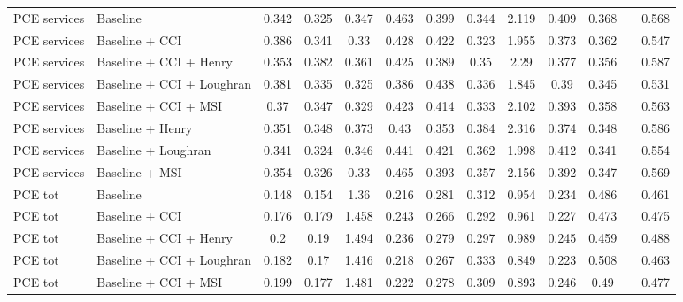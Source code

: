 \begin{table}[H]
{\begin{tabular}{llcccccccccp{1ex}c}
\hdashline 																							
PCE services	&	Baseline	&	0.342	&	0.325	&	0.347	&	0.463	&	0.399	&	0.344	&	2.119	&	0.409	&	\cellcolor{red!25}0.368	&&	0.568	\\
PCE services	&	Baseline + CCI	&	\cellcolor{red!25}0.386	&	0.341	&	0.33	&	0.428	&	0.422	&	0.323	&	1.955	&	\cellcolor{green!25}0.373	&	0.362	&&	0.547	\\
PCE services	&	Baseline + CCI + Henry	&	0.353	&	\cellcolor{red!25}0.382	&	0.361	&	0.425	&	0.389	&	0.35	&	2.29	&	0.377	&	0.356	&&	\cellcolor{red!25}0.587	\\
PCE services	&	Baseline + CCI + Loughran	&	0.381	&	0.335	&	\cellcolor{green!25}0.325	&	\cellcolor{green!25}0.386	&	\cellcolor{red!25}0.438	&	0.336	&	\cellcolor{green!25}1.845	&	0.39	&	0.345	&&	\cellcolor{green!25}0.531\\
PCE services	&	Baseline + CCI + MSI	&	0.37	&	0.347	&	0.329	&	0.423	&	0.414	&	0.333	&	2.102	&	0.393	&	0.358	&&	0.563	\\
PCE services	&	Baseline + Henry	&	0.351	&	0.348	&	\cellcolor{red!25}0.373	&	0.43	&	\cellcolor{green!25}0.353	&	\cellcolor{green!25}0.384	&	\cellcolor{red!25}2.316	&	0.374	&	0.348	&&	0.586	\\
PCE services	&	Baseline + Loughran	&	\cellcolor{green!25}0.341	&	\cellcolor{green!25}0.324	&	0.346	&	0.441	&	0.421	&	\cellcolor{red!25}0.362	&	1.998	&	\cellcolor{red!25}0.412	&	\cellcolor{green!25}0.341	&&	0.554	\\
PCE services	&	Baseline + MSI	&	0.354	&	0.326	&	0.33	&	\cellcolor{red!25}0.465	&	0.393	&	0.357	&	2.156	&	0.392	&	0.347	&&	0.569	\\
\hdashline 																							
PCE tot	&	Baseline	&	\cellcolor{green!25}0.148	&	0.154	&	1.36	&	0.216	&	0.281	&	0.312	&	0.954	&	0.234	&	0.486	&&	0.461	\\
PCE tot	&	Baseline + CCI	&	0.176	&	0.179	&	1.458	&	\cellcolor{red!25}0.243	&	\cellcolor{green!25}0.266	&	\cellcolor{green!25}0.292	&	0.961	&	0.227	&	0.473	&&	0.475	\\
PCE tot	&	Baseline + CCI + Henry	&	\cellcolor{red!25}0.2	&	\cellcolor{red!25}0.19	&	\cellcolor{red!25}1.494	&	0.236	&	0.279	&	0.297	&	\cellcolor{red!25}0.989	&	0.245	&	\cellcolor{green!25}0.459	&&	\cellcolor{red!25}0.488\\
PCE tot	&	Baseline + CCI + Loughran	&	0.182	&	0.17	&	1.416	&	0.218	&	0.267	&	0.333	&	0.849	&	\cellcolor{green!25}0.223	&	0.508	&&	0.463	\\
PCE tot	&	Baseline + CCI + MSI	&	0.199	&	0.177	&	1.481	&	0.222	&	0.278	&	0.309	&	0.893	&	\cellcolor{red!25}0.246	&	0.49	&&	0.477	\\

\end{tabular}}
\end{table}
